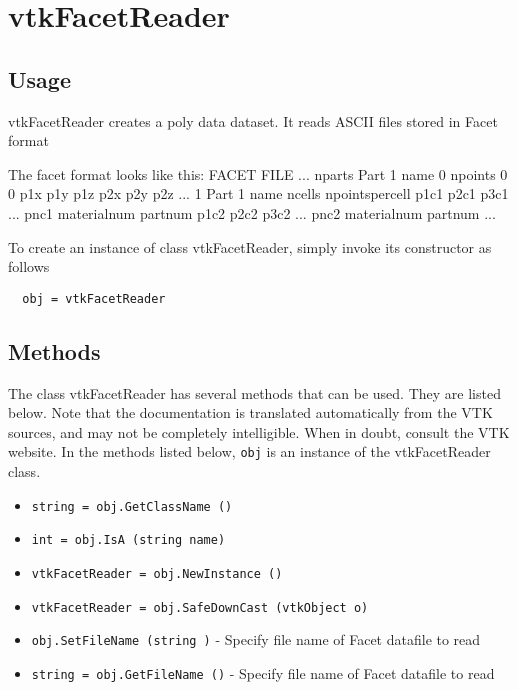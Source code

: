 \section{vtkFacetReader}

\subsection{Usage}

 vtkFacetReader creates a poly data dataset. It reads ASCII files
 stored in Facet format

 The facet format looks like this:
 FACET FILE ...
 nparts
 Part 1 name
 0
 npoints 0 0
 p1x p1y p1z
 p2x p2y p2z
 ...
 1
 Part 1 name
 ncells npointspercell
 p1c1 p2c1 p3c1 ... pnc1 materialnum partnum
 p1c2 p2c2 p3c2 ... pnc2 materialnum partnum
 ...

To create an instance of class vtkFacetReader, simply
invoke its constructor as follows
\begin{verbatim}
  obj = vtkFacetReader
\end{verbatim}
\subsection{Methods}

The class vtkFacetReader has several methods that can be used.
  They are listed below.
Note that the documentation is translated automatically from the VTK sources,
and may not be completely intelligible.  When in doubt, consult the VTK website.
In the methods listed below, \verb|obj| is an instance of the vtkFacetReader class.
\begin{itemize}
\item  \verb|string = obj.GetClassName ()|

\item  \verb|int = obj.IsA (string name)|

\item  \verb|vtkFacetReader = obj.NewInstance ()|

\item  \verb|vtkFacetReader = obj.SafeDownCast (vtkObject o)|

\item  \verb|obj.SetFileName (string )| -  Specify file name of Facet datafile to read

\item  \verb|string = obj.GetFileName ()| -  Specify file name of Facet datafile to read

\end{itemize}
